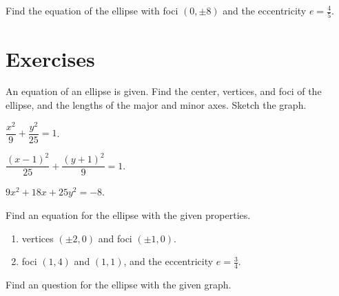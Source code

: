 \begin{example}
    Find the equation of the ellipse with foci $(0, \pm8)$ and the eccentricity $e=\frac45$.
\end{example}


\newpage
\section*{Exercises}


\begin{exercise}
    An equation of an ellipse is given. Find the center, vertices, and foci of the ellipse, and the lengths of the major and minor axes. Sketch the graph.\\
    \begin{enumerate*}
        \item $\dfrac{x^2}{9}+\dfrac{y^2}{25}=1$.
        \item $\dfrac{(x-1)^2}{25}+\dfrac{(y+1)^2}{9}=1$.
        \item $9x^2+18x+25y^2=-8$.
    \end{enumerate*}
\end{exercise}

\begin{exercise}
  Find an equation for the ellipse with the given properties.
  \begin{enumerate}
      \item  vertices $(\pm 2, 0)$ and foci $(\pm 1, 0)$.
      \item  foci $(1,4)$ and $(1,1)$, and the eccentricity $e=\frac34$.
  \end{enumerate}
  \end{exercise}
  
\newpage
  \begin{exercise}
      Find an question for the ellipse with the given graph.\\
  \end{exercise}

